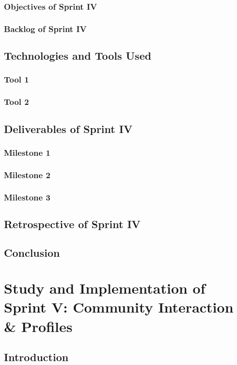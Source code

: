 \documentclass[a4paper,12pt]{report}
\begin{document}
\subsection{Objectives of Sprint IV}
\subsection{Backlog of Sprint IV}
\section{Technologies and Tools Used}
\subsection{Tool 1}
\subsection{Tool 2}
\section{Deliverables of Sprint IV}
\subsection{Milestone 1}
\subsection{Milestone 2}
\subsection{Milestone 3}
\section{Retrospective of Sprint IV}
\section{Conclusion}

\chapter[Sprint V]{Study and Implementation of Sprint V: Community Interaction \& Profiles}

\minitoc
\section{Introduction}
\end{document}
